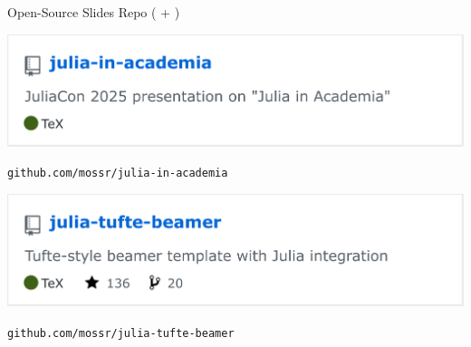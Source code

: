 \begin{frame}[fragile]{Open-Source Slides Repo ( + )} \pause

\centering

\includegraphics[width=0.5\linewidth]{media/julia-in-academia.png}

\textcolor{repo}{\small \texttt{github.com/mossr/julia-in-academia}}

\pause

\phantom{---}

\phantom{---}

\includegraphics[width=0.5\linewidth]{media/julia-tufte-beamer.png}

\textcolor{repo}{\small \texttt{github.com/mossr/julia-tufte-beamer}}

\end{frame}